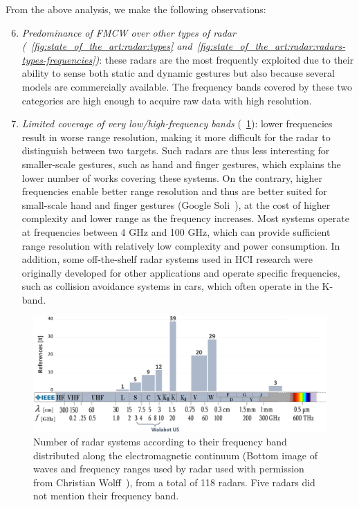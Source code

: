From the above analysis, we make the following observations:
\begin{enumerate}
\setcounter{enumi}{5}
    \item \textit{Predominance of FMCW over other types of radar (\fig~\ref{fig:state_of_the_art:radar:types} and~\ref{fig:state_of_the_art:radar:radars-types-frequencies})}: these radars are the most frequently exploited due to their ability to sense both static and dynamic gestures but also because several models are commercially available. The frequency bands covered by these two categories are high enough to acquire raw data with high resolution.
    \item \textit{Limited coverage of very low/high-frequency bands} (\fig~\ref{fig:state_of_the_art:IEEE}): lower frequencies result in worse range resolution, making it more difficult for the radar to distinguish between two targets. Such radars are thus less interesting for smaller-scale gestures, such as hand and finger gestures, which explains the lower number of works covering these systems. On the contrary, higher frequencies enable better range resolution and thus are better suited for small-scale hand and finger gestures (\eg Google Soli~\cite{Lien:2016,Wang:2016}), at the cost of higher complexity and lower range as the frequency increases. Most systems operate at frequencies between 4 GHz and 100 GHz, which can provide sufficient range resolution with relatively low complexity and power consumption. In addition, some off-the-shelf radar systems used in HCI research were originally developed for other applications and operate specific frequencies, such as collision avoidance systems in cars, which often operate in the K-band. 
\end{enumerate}

\begin{figure}[t]
    \centering
    \includegraphics[width=\textwidth]{Figures/StateOfTheArt/Radar/IEEE-bands.pdf}
    \vspace{-12pt}
    \caption{Number of radar systems according to their frequency band~\cite{IEEE:2020} distributed along the electromagnetic continuum (Bottom image of waves and frequency ranges used by radar used with permission from Christian Wolff~\cite{Wolff:2022}), from a total of 118 radars. Five radars did not mention their frequency band.}
    \label{fig:state_of_the_art:IEEE}
    \vspace{10pt}
\end{figure}

